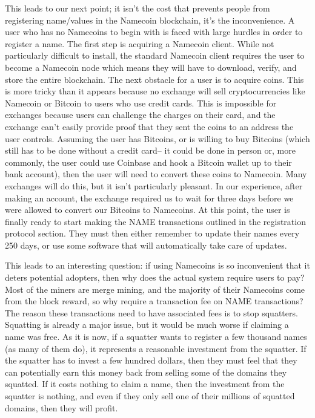This leads to our next point; it isn't the cost that prevents people from registering name/values in the Namecoin blockchain, it's the inconvenience. A user who has no Namecoins to begin with is faced with large hurdles in order to register a name. The first step is acquiring a Namecoin client. While not particularly difficult to install, the standard Namecoin client requires the user to become a Namecoin node which means they will have to download, verify, and store the entire blockchain. The next obstacle for a user is to acquire coins. This is more tricky than it appears because no exchange will sell cryptocurrencies like Namecoin or Bitcoin to users who use credit cards. This is impossible for exchanges because users can challenge the charges on their card, and the exchange can't easily provide proof that they sent the coins to an address the user controls. Assuming the user has Bitcoins, or is willing to buy Bitcoins (which still has to be done without a credit card-- it could be done in person or, more commonly, the user could use Coinbase and hook a Bitcoin wallet up to their bank account), then the user will need to convert these coins to Namecoin. Many exchanges will do this, but it isn't particularly pleasant. In our experience, after making an account, the exchange required us to wait for three days before we were allowed to convert our Bitcoins to Namecoins. At this point, the user is finally ready to start making the NAME transactions outlined in the registration protocol section. They must then either remember to update their names every 250 days, or use some software that will automatically take care of updates.

This leads to an interesting question: if using Namecoins is so inconvenient that it deters potential adopters, then why does the actual system require users to pay? Most of the miners are merge mining, and the majority of their Namecoins come from the block reward, so why require a transaction fee on NAME transactions? The reason these transactions need to have associated fees is to stop squatters. Squatting is already a major issue, but it would be much worse if claiming a name was free. As it is now, if a squatter wants to register a few thousand names (as many of them do),  it represents a reasonable investment from the squatter. If the squatter has to invest a few hundred dollars, then they must feel that they can potentially earn this money back from selling some of the domains they squatted. If it costs nothing to claim a name, then the investment from the squatter is nothing, and even if they only sell one of their millions of squatted domains, then they will profit. 


